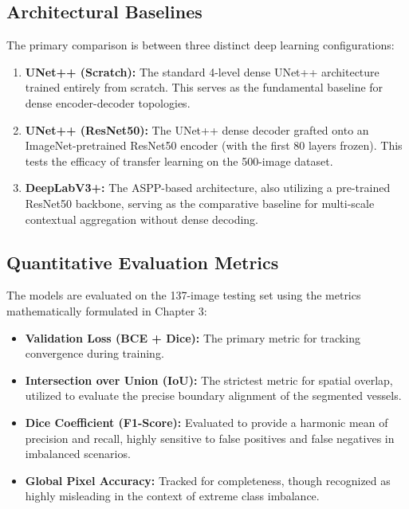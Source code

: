 \subsection{Architectural Baselines}
The primary comparison is between three distinct deep learning configurations:
\begin{enumerate}
    \item \textbf{UNet++ (Scratch):} The standard 4-level dense UNet++ architecture trained entirely from scratch. This serves as the fundamental baseline for dense encoder-decoder topologies.
    \item \textbf{UNet++ (ResNet50):} The UNet++ dense decoder grafted onto an ImageNet-pretrained ResNet50 encoder (with the first 80 layers frozen). This tests the efficacy of transfer learning on the 500-image dataset.
    \item \textbf{DeepLabV3+:} The ASPP-based architecture, also utilizing a pre-trained ResNet50 backbone, serving as the comparative baseline for multi-scale contextual aggregation without dense decoding.
\end{enumerate}

\subsection{Quantitative Evaluation Metrics}
The models are evaluated on the 137-image testing set using the metrics mathematically formulated in Chapter 3:
\begin{itemize}
    \item \textbf{Validation Loss (BCE + Dice):} The primary metric for tracking convergence during training.
    \item \textbf{Intersection over Union (IoU):} The strictest metric for spatial overlap, utilized to evaluate the precise boundary alignment of the segmented vessels.
    \item \textbf{Dice Coefficient (F1-Score):} Evaluated to provide a harmonic mean of precision and recall, highly sensitive to false positives and false negatives in imbalanced scenarios.
    \item \textbf{Global Pixel Accuracy:} Tracked for completeness, though recognized as highly misleading in the context of extreme class imbalance.
\end{itemize}

